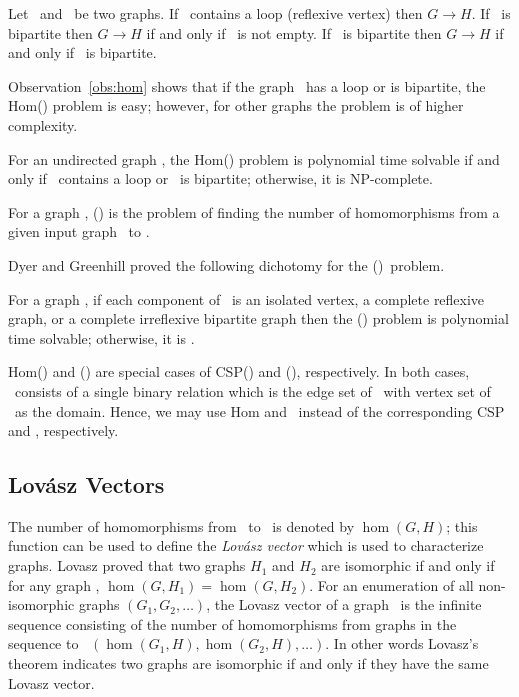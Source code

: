 \begin{obs}\label{obs:hom}
Let \mG\ and \mH\ be two graphs.
If \mH\ contains a loop (reflexive vertex) then \(G \to H\)\@.
If \mG\ is bipartite then \(G \to H\) if and only if \mH\ is not empty.
If \mH\ is bipartite then \(G \to H\) if and only if \mG\ is bipartite.
\end{obs}

Observation~\ref{obs:hom} shows that if the graph \mH\ has a loop or is bipartite,
the Hom(\mH) problem is easy; however, for other graphs the problem is of higher complexity.

\begin{theorem} 
For an undirected graph \mH, the Hom(\mH) problem is polynomial time solvable if and only
if \mH\ contains a loop or \mH\ is bipartite; otherwise, it is NP-complete.
\end{theorem}

\begin{defi}[\chom(\mH)]
For a graph \mH,
\chom(\mH) is the problem of finding the number of homomorphisms from a given 
input graph \mG\ to \mH.
\end{defi}

Dyer and Greenhill proved the following dichotomy for the \chom(\mH)\ problem.
\begin{theorem} 
For a graph \mH, if each component of \mH\ is an isolated vertex, a complete reflexive graph,
or a complete irreflexive bipartite graph then the \chom(\mH) problem 
is polynomial time solvable; otherwise, it is \cpc\@.
\end{theorem}

Hom(\mH) and \chom(\mH) are special cases of CSP(\mrelset) and \ccsp(\mrelset),
respectively. In both cases, \mrelset\ consists of a single binary relation which is the
edge set of \mH\ with vertex set of \mH\ as the domain.
Hence, we may use Hom and \chom\ instead of
the corresponding CSP and \ccsp, respectively. 

\subsection*{Lov\'{a}sz Vectors}
The number of homomorphisms from \mG\ to \mH\ is denoted by \(\hom(G,H)\); this function
can be used to define the \emph{Lov\'{a}sz vector} which is used to characterize graphs.
Lovasz \cite{lovasz} proved that
two graphs \(H_1\) and \(H_2\) are isomorphic if and only if for any graph \mG,
\(\hom(G,H_1)=\hom(G,H_2)\). 
For an enumeration of all non-isomorphic graphs \((G_1,G_2,\dotsc)\), 
the Lovasz vector of a graph \mH\ is the infinite sequence consisting of the number of
homomorphisms from graphs in the sequence to \mH\ 
\((\hom(G_1,H), \hom(G_2,H), \dotsc)\)\@. 
In other words Lovasz's theorem indicates two graphs are isomorphic if and only if
they have the same Lovasz vector.  

